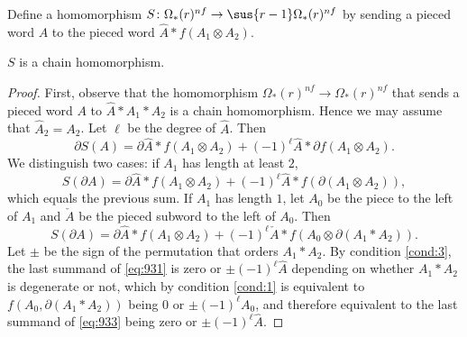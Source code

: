 \begin{definition}
	Define a homomorphism $S\colon \Omega_*(r)^{nf}\to \sus{r-1}\Omega_*(r)^{nf}$ by sending a pieced word $A$ to the pieced word $\hat{A}*f(A_1\otimes A_2)$. %
\end{definition}

\begin{lemma}\label{lemma:pieced_suspension}
	$S$ is a chain homomorphism.
\end{lemma}

\begin{proof}
    First, observe that the homomorphism $\Omega_*(r)^{nf}\to \Omega_*(r)^{nf}$ that sends a pieced word $A$ to $\hat{A}*A_1*A_2$ is a chain homomorphism. Hence we may assume that $\hat{A}_2 = A_2$. Let $\ell$ be the degree of $\hat{A}$. Then %
	\begin{equation}\label{eq:931}
		\partial S(A) = \partial \hat{A}*f(A_1\otimes A_2) + (-1)^{\ell}\hat{A}*\partial f(A_1\otimes A_2).
	\end{equation}
	We distinguish two cases: if $A_1$ has length at least $2$,
	\[S(\partial A) = \partial \hat{A}*f(A_1\otimes A_2) + (-1)^{\ell}\hat{A}*f(\partial (A_1\otimes A_2)),\]
	which equals the previous sum. If $A_1$ has length $1$, let $A_0$ be the piece to the left of $A_1$ and $\check{A}$ be the pieced subword to the left of $A_0$. Then
	\begin{equation}\label{eq:933}
		S(\partial A) = \partial \hat{A}*f(A_1\otimes A_2) + (-1)^\ell \check{A}*f(A_0\otimes \partial(A_1*A_2)).
	\end{equation}
	Let $\pm$ be the sign of the permutation that orders $A_1*A_2$. By condition \eqref{cond:3}, the last summand of \eqref{eq:931} is zero or $\pm(-1)^\ell\hat{A}$ depending on whether $A_1*A_2$ is degenerate or not, which by condition \eqref{cond:1} is equivalent to $f(A_0,\partial(A_1*A_2))$ being $0$ or $\pm(-1)^{\ell}A_0$, and therefore equivalent to the last summand of \eqref{eq:933} being zero or $\pm(-1)^{\ell}\hat{A}$.
\end{proof}

